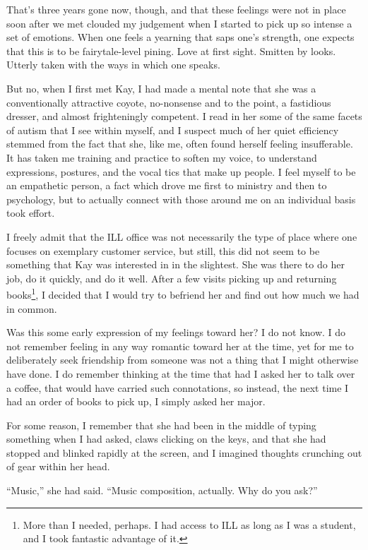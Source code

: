 That's three years gone now, though, and that these feelings were not in place soon after we met clouded my judgement when I started to pick up so intense a set of emotions. When one feels a yearning that saps one's strength, one expects that this is to be fairytale-level pining. Love at first sight. Smitten by looks. Utterly taken with the ways in which one speaks.

But no, when I first met Kay, I had made a mental note that she was a conventionally attractive coyote, no-nonsense and to the point, a fastidious dresser, and almost frighteningly competent. I read in her some of the same facets of autism that I see within myself, and I suspect much of her quiet efficiency stemmed from the fact that she, like me, often found herself feeling insufferable. It has taken me training and practice to soften my voice, to understand expressions, postures, and the vocal tics that make up people. I feel myself to be an empathetic person, a fact which drove me first to ministry and then to psychology, but to actually connect with those around me on an individual basis took effort.

I freely admit that the ILL office was not necessarily the type of place where one focuses on exemplary customer service, but still, this did not seem to be something that Kay was interested in in the slightest. She was there to do her job, do it quickly, and do it well. After a few visits picking up and returning books\footnote{More than I needed, perhaps. I had access to ILL as long as I was a student, and I took fantastic advantage of it.}, I decided that I would try to befriend her and find out how much we had in common.

Was this some early expression of my feelings toward her? I do not know. I do not remember feeling in any way romantic toward her at the time, yet for me to deliberately seek friendship from someone was not a thing that I might otherwise have done. I do remember thinking at the time that had I asked her to talk over a coffee, that would have carried such connotations, so instead, the next time I had an order of books to pick up, I simply asked her major.

For some reason, I remember that she had been in the middle of typing something when I had asked, claws clicking on the keys, and that she had stopped and blinked rapidly at the screen, and I imagined thoughts crunching out of gear within her head.

``Music,'' she had said. ``Music composition, actually. Why do you ask?''

